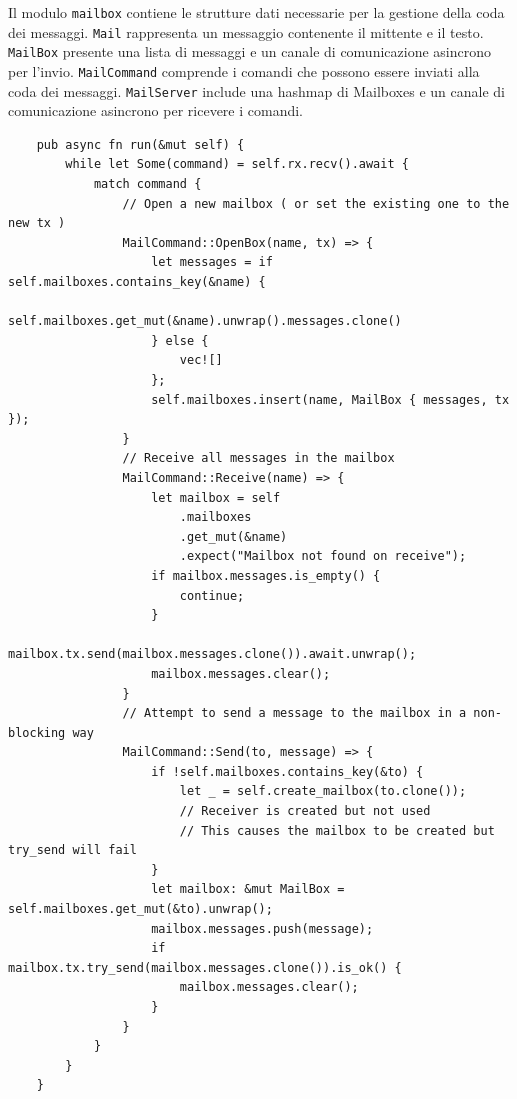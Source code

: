 Il modulo \texttt{mailbox} contiene le strutture dati necessarie per la gestione della coda dei messaggi.
\texttt{Mail} rappresenta un messaggio contenente il mittente e il testo.
\texttt{MailBox}  presente una lista di messaggi e un canale di comunicazione asincrono per l'invio.
\texttt{MailCommand} comprende i comandi che possono essere inviati alla coda dei messaggi.
\texttt{MailServer} include una hashmap di Mailboxes e un canale di comunicazione asincrono per ricevere i comandi.

\begin{listing}[H]
    \begin{verbatim}
    pub async fn run(&mut self) {
        while let Some(command) = self.rx.recv().await {
            match command {
                // Open a new mailbox ( or set the existing one to the new tx )
                MailCommand::OpenBox(name, tx) => {
                    let messages = if self.mailboxes.contains_key(&name) {
                        self.mailboxes.get_mut(&name).unwrap().messages.clone()
                    } else {
                        vec![]
                    };
                    self.mailboxes.insert(name, MailBox { messages, tx });
                }
                // Receive all messages in the mailbox
                MailCommand::Receive(name) => {
                    let mailbox = self
                        .mailboxes
                        .get_mut(&name)
                        .expect("Mailbox not found on receive");
                    if mailbox.messages.is_empty() {
                        continue;
                    }
                    mailbox.tx.send(mailbox.messages.clone()).await.unwrap();
                    mailbox.messages.clear();
                }
                // Attempt to send a message to the mailbox in a non-blocking way
                MailCommand::Send(to, message) => {
                    if !self.mailboxes.contains_key(&to) {
                        let _ = self.create_mailbox(to.clone());
                        // Receiver is created but not used
                        // This causes the mailbox to be created but try_send will fail
                    }
                    let mailbox: &mut MailBox = self.mailboxes.get_mut(&to).unwrap();
                    mailbox.messages.push(message);
                    if mailbox.tx.try_send(mailbox.messages.clone()).is_ok() {
                        mailbox.messages.clear();
                    }
                }
            }
        }
    }
    \end{verbatim}
\end{listing}

